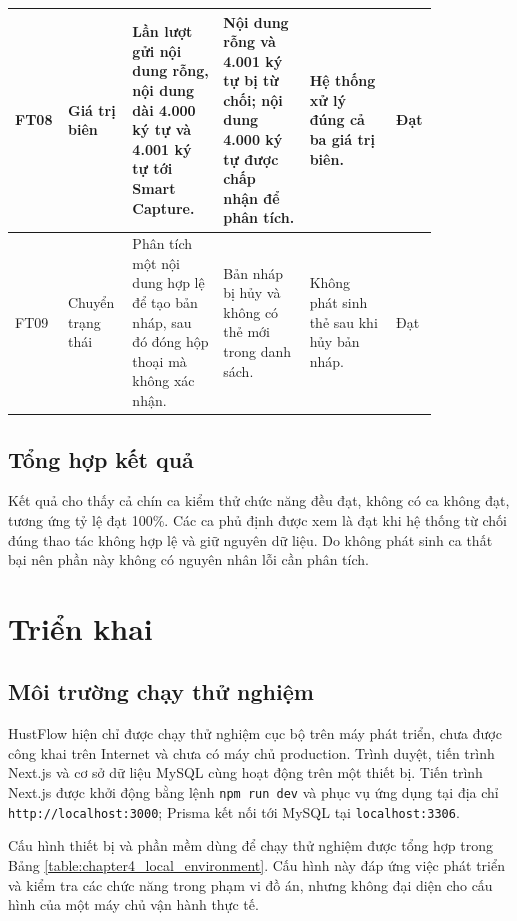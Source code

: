\documentclass[../DoAn.tex]{subfiles}
\begin{document}
\begin{longtable}{|p{0.055\linewidth}|p{0.13\linewidth}|p{0.205\linewidth}|p{0.19\linewidth}|p{0.19\linewidth}|p{0.065\linewidth}|}
    FT08 & Giá trị biên & Lần lượt gửi nội dung rỗng, nội dung dài 4.000 ký tự và 4.001 ký tự tới Smart Capture. & Nội dung rỗng và 4.001 ký tự bị từ chối; nội dung 4.000 ký tự được chấp nhận để phân tích. & Hệ thống xử lý đúng cả ba giá trị biên. & Đạt \\ \hline
    FT09 & Chuyển trạng thái & Phân tích một nội dung hợp lệ để tạo bản nháp, sau đó đóng hộp thoại mà không xác nhận. & Bản nháp bị hủy và không có thẻ mới trong danh sách. & Không phát sinh thẻ sau khi hủy bản nháp. & Đạt \\ \hline
\end{longtable}
\endgroup

\subsection{Tổng hợp kết quả}
\label{subsection:4.4.3}

Kết quả cho thấy cả chín ca kiểm thử chức năng đều đạt, không có ca không đạt, tương ứng tỷ lệ đạt 100\%. Các ca phủ định được xem là đạt khi hệ thống từ chối đúng thao tác không hợp lệ và giữ nguyên dữ liệu. Do không phát sinh ca thất bại nên phần này không có nguyên nhân lỗi cần phân tích.

\section{Triển khai}
\label{section:4.5}

\subsection{Môi trường chạy thử nghiệm}
\label{subsection:4.5.1}

HustFlow hiện chỉ được chạy thử nghiệm cục bộ trên máy phát triển, chưa được công khai trên Internet và chưa có máy chủ production. Trình duyệt, tiến trình Next.js và cơ sở dữ liệu MySQL cùng hoạt động trên một thiết bị. Tiến trình Next.js được khởi động bằng lệnh \texttt{npm run dev} và phục vụ ứng dụng tại địa chỉ \texttt{http://localhost:3000}; Prisma kết nối tới MySQL tại \texttt{localhost:3306}.

Cấu hình thiết bị và phần mềm dùng để chạy thử nghiệm được tổng hợp trong Bảng \ref{table:chapter4_local_environment}. Cấu hình này đáp ứng việc phát triển và kiểm tra các chức năng trong phạm vi đồ án, nhưng không đại diện cho cấu hình của một máy chủ vận hành thực tế.
\end{document}
